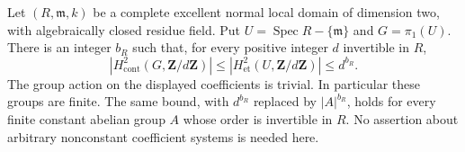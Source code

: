 \begin{theorem}
\label{D:local-surface-constant-H2}
Let $(R,\mathfrak m,k)$ be a complete excellent normal local
domain of dimension two, with algebraically closed residue field.
Put $U=\operatorname{Spec}R-\{\mathfrak m\}$ and
$G=\pi_1(U)$. There is an integer $b_R$ such that, for every
positive integer $d$ invertible in $R$,
\[
 |H^2_{\mathrm{cont}}(G,\mathbf Z/d\mathbf Z)|
 \le |H^2_{\mathrm{et}}(U,\mathbf Z/d\mathbf Z)|
 \le d^{b_R}.                                         \tag{D.LH2.1}
\]
The group action on the displayed coefficients is trivial.
In particular these groups are finite. The same bound, with
$d^{b_R}$ replaced by $|A|^{b_R}$, holds for every finite
constant abelian group $A$ whose order is invertible in $R$.
No assertion about arbitrary nonconstant coefficient systems
is needed here.
\end{theorem}
